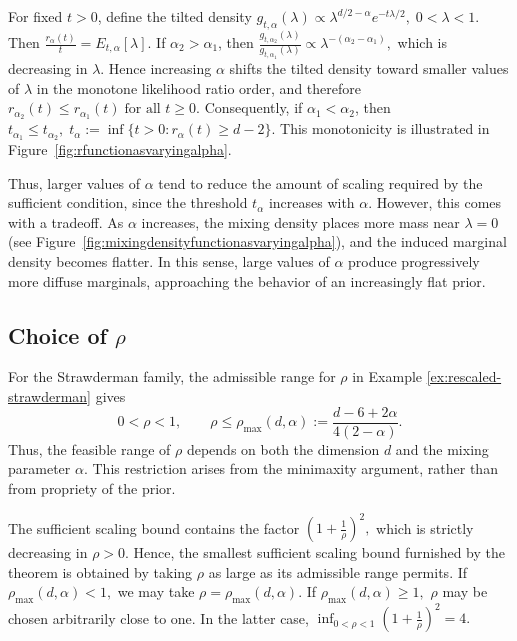 \documentclass[11pt]{article}
\theoremstyle{definition}
\begin{document}
For fixed $t>0$, define the tilted density $g_{t,\alpha}(\lambda)
\propto
\lambda^{d/2-\alpha}e^{-t\lambda/2},
\;
0<\lambda<1.$ Then $\frac{r_\alpha(t)}{t}
=
E_{t,\alpha}[\lambda].$ If $\alpha_2>\alpha_1$, then $\frac{g_{t,\alpha_2}(\lambda)}{g_{t,\alpha_1}(\lambda)}
\propto
\lambda^{-(\alpha_2-\alpha_1)},$ which is decreasing in $\lambda$. Hence increasing $\alpha$ shifts the
tilted density toward smaller values of $\lambda$ in the monotone likelihood ratio order, and therefore $r_{\alpha_2}(t)\le r_{\alpha_1}(t)
\;
\text{for all }t\ge0.$ Consequently, if $\alpha_1<\alpha_2$, then $t_{\alpha_1}\le t_{\alpha_2},
\;
t_\alpha
:=
\inf\{t>0:r_\alpha(t)\ge d-2\}.$ This monotonicity is illustrated in
Figure~\ref{fig:rfunctionasvaryingalpha}.

Thus, larger values of $\alpha$ tend to reduce the amount of scaling required by the sufficient condition,
since the threshold $t_\alpha$ increases with $\alpha$. However, this comes with a tradeoff. As $\alpha$ increases, the mixing density places
more mass near $\lambda=0$ (see
Figure~\ref{fig:mixingdensityfunctionasvaryingalpha}), and the induced
marginal density becomes flatter. In this sense, large values of $\alpha$ produce progressively more diffuse marginals, approaching
the behavior of an increasingly flat prior.


\subsection{Choice of \texorpdfstring{$\rho$}{rho}}
\label{subsec:choice-rho}

For the Strawderman family, the admissible range for $\rho$ in Example \ref{ex:rescaled-strawderman} gives
\[
0<\rho<1,
\qquad
\rho
\leq
\rho_{\max}(d,\alpha)
:=
\frac{d-6+2\alpha}{4(2-\alpha)}.
\]
Thus, the feasible range of $\rho$ depends on both the dimension $d$ and the mixing parameter $\alpha$. This restriction arises from the minimaxity argument, rather than from propriety of the prior.

The sufficient scaling bound contains the factor $\left(1+\frac1\rho\right)^2,$ which is strictly decreasing in $\rho>0$. Hence, the smallest
sufficient scaling bound furnished by the theorem is obtained by taking $\rho$ as large as its admissible range permits. If $\rho_{\max}(d,\alpha)<1,$ we may take $\rho=\rho_{\max}(d,\alpha).$ If $\rho_{\max}(d,\alpha)\geq1,$ $\rho$ may be chosen
arbitrarily close to one. In the latter case, $\inf_{0<\rho<1}
\left(1+\frac1\rho\right)^2
=
4.$ 
\end{document}

